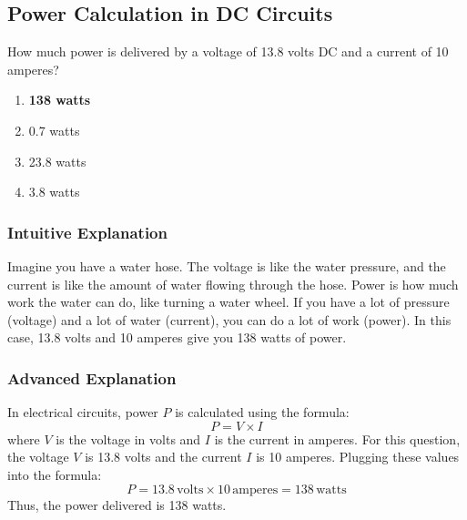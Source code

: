 \subsection{Power Calculation in DC Circuits}
\label{T5C09}

\begin{tcolorbox}[colback=gray!10!white,colframe=black!75!black,title=T5C09]
How much power is delivered by a voltage of 13.8 volts DC and a current of 10 amperes?
\begin{enumerate}[noitemsep]
    \item \textbf{138 watts}
    \item 0.7 watts
    \item 23.8 watts
    \item 3.8 watts
\end{enumerate}
\end{tcolorbox}

\subsubsection*{Intuitive Explanation}
Imagine you have a water hose. The voltage is like the water pressure, and the current is like the amount of water flowing through the hose. Power is how much work the water can do, like turning a water wheel. If you have a lot of pressure (voltage) and a lot of water (current), you can do a lot of work (power). In this case, 13.8 volts and 10 amperes give you 138 watts of power.

\subsubsection*{Advanced Explanation}
In electrical circuits, power \( P \) is calculated using the formula:
\[
P = V \times I
\]
where \( V \) is the voltage in volts and \( I \) is the current in amperes. For this question, the voltage \( V \) is 13.8 volts and the current \( I \) is 10 amperes. Plugging these values into the formula:
\[
P = 13.8 \, \text{volts} \times 10 \, \text{amperes} = 138 \, \text{watts}
\]
Thus, the power delivered is 138 watts.